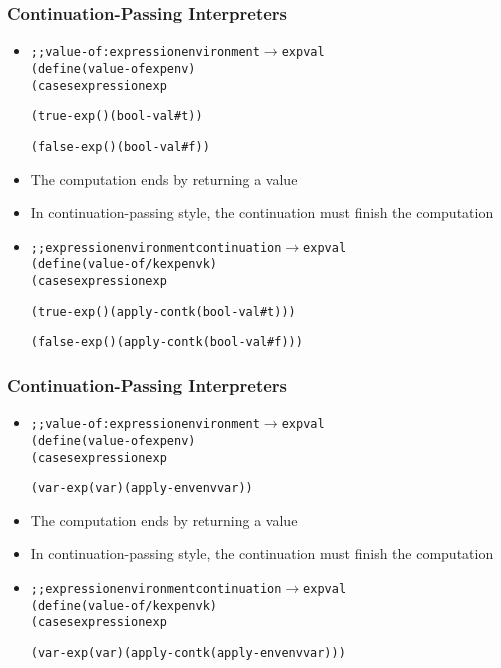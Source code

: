 \documentclass{beamer}
\newcommand{\arrow}{\(\rightarrow\)}
\begin{document}
\begin{frame}[fragile]
\frametitle{Continuation-Passing Interpreters}
\begin{scriptsize}
\begin{itemize}
\item<1->
\begin{alltt}
;; value-of : expression environment \arrow{} expval
(define (value-of exp env)
  (cases expression exp

    (true-exp () (bool-val #t))

    (false-exp () (bool-val #f))
\end{alltt}

\item<1-> The computation ends by returning a value

\item<1-> In continuation-passing style, the continuation must finish the computation

\item<2->
\begin{alltt}
;; expression environment continuation \arrow{} expval
(define (value-of/k exp env k)
  (cases expression exp

    (true-exp () (apply-cont k (bool-val #t)))

    (false-exp () (apply-cont k (bool-val #f)))
\end{alltt}

\end{itemize}
\end{scriptsize}
\end{frame}

\begin{frame}[fragile]
\frametitle{Continuation-Passing Interpreters}
\begin{scriptsize}
\begin{itemize}
\item<1->
\begin{alltt}
;; value-of : expression environment \arrow{} expval
(define (value-of exp env)
  (cases expression exp

    (var-exp (var) (apply-env env var))
\end{alltt}

\item<1-> The computation ends by returning a value

\item<1-> In continuation-passing style, the continuation must finish the computation

\item<2->
\begin{alltt}
;; expression environment continuation \arrow{} expval
(define (value-of/k exp env k)
  (cases expression exp

    (var-exp (var) (apply-cont k (apply-env env var)))
\end{alltt}

\end{itemize}
\end{scriptsize}
\end{frame}
\end{document}
